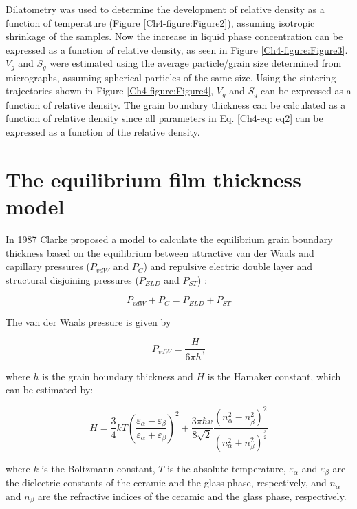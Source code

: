 Dilatometry was used to determine the development of relative density as a function of temperature (Figure \ref{Ch4-figure:Figure2}), assuming isotropic shrinkage of the samples. Now the increase in liquid phase concentration can be expressed as a function of relative density, as seen in Figure \ref{Ch4-figure:Figure3}. $V_{g}$ and $S_{g}$ were estimated using the average particle/grain size determined from micrographs, assuming spherical particles of the same size. Using the sintering trajectories shown in Figure \ref{Ch4-figure:Figure4}, $V_{g}$ and $S_{g}$ can be expressed as a function of relative density. The grain boundary thickness can be calculated as a function of relative density since all parameters in Eq. \ref{Ch4-eq: eq2} can be expressed as a function of the relative density.

\section{The equilibrium film thickness model}
In 1987 Clarke proposed a model to calculate the equilibrium grain boundary thickness based on the equilibrium between attractive van der Waals and capillary pressures ($P_{vdW}$ and $P_{C}$) and repulsive electric double layer and structural disjoining pressures ($P_{ELD}$ and $P_{ST}$) \cite{Clarke1987,Clarke1993}:

\begin{equation}
\label{Ch4-eq: eq3}
P_{vdW} + P_{C} = P_{ELD} + P_{ST} 
\end{equation}

\noindent The van der Waals pressure is given by

\begin{equation}
\label{Ch4-eq: eq4}
P_{vdW} = \frac{H}{6 \pi h^{3}}
\end{equation}

\noindent where $h$ is the grain boundary thickness and $H$ is the Hamaker constant, which can be estimated by:

\begin{equation}
\label{Ch4-eq: eq5}
H = \frac{3}{4}kT\left( \frac{\varepsilon_{\alpha} - \varepsilon_{\beta}}{\varepsilon_{\alpha} + \varepsilon_{\beta}} \right)^{2} + \frac{3 \pi \hbar v}{8 \sqrt{2}} \frac{\left( n_{\alpha}^{2} - n_{\beta}^{2} \right)^{2}}{\left( n_{\alpha}^{2} + n_{\beta}^{2} \right)^{\frac{3}{2}}}
\end{equation}

\noindent where $k$ is the Boltzmann constant, $T$ is the absolute temperature, $\varepsilon_{\alpha}$ and $\varepsilon_{\beta}$ are the dielectric constants of the ceramic and the glass phase, respectively, and $n_{\alpha}$ and $n_{\beta}$ are the refractive indices of the ceramic and the glass phase, respectively.

